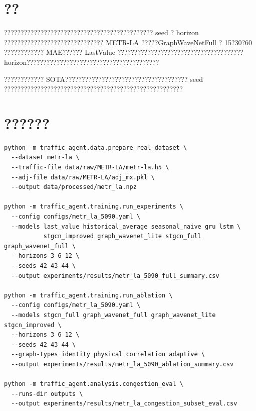 \documentclass[11pt]{ctexart}
\begin{document}
\section{??}
????????????????????????????????????????????? seed ? horizon ?????????????????????????????? METR-LA ?????GraphWaveNetFull ? 15?30?60 ???????????? MAE?????? LastValue ?????????????????????????????????????? horizon????????????????????????????????????????

???????????? SOTA????????????????????????????????????? seed ??????????????????????????????????????????????????????

\appendix
\section{??????}
\begin{verbatim}
python -m traffic_agent.data.prepare_real_dataset \
  --dataset metr-la \
  --traffic-file data/raw/METR-LA/metr-la.h5 \
  --adj-file data/raw/METR-LA/adj_mx.pkl \
  --output data/processed/metr_la.npz

python -m traffic_agent.training.run_experiments \
  --config configs/metr_la_5090.yaml \
  --models last_value historical_average seasonal_naive gru lstm \
           stgcn_improved graph_wavenet_lite stgcn_full graph_wavenet_full \
  --horizons 3 6 12 \
  --seeds 42 43 44 \
  --output experiments/results/metr_la_5090_full_summary.csv

python -m traffic_agent.training.run_ablation \
  --config configs/metr_la_5090.yaml \
  --models stgcn_full graph_wavenet_full graph_wavenet_lite stgcn_improved \
  --horizons 3 6 12 \
  --seeds 42 43 44 \
  --graph-types identity physical correlation adaptive \
  --output experiments/results/metr_la_5090_ablation_summary.csv

python -m traffic_agent.analysis.congestion_eval \
  --runs-dir outputs \
  --output experiments/results/metr_la_congestion_subset_eval.csv
\end{verbatim}
\end{document}
